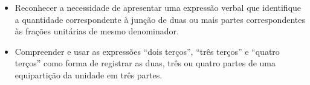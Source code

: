   \begin{objetivos}[label=chap2-ativ2]{}{}
  \begin{itemize} %
    \item Reconhecer a necessidade de apresentar uma expressão verbal que identifique a quantidade correspondente à junção de duas ou mais partes correspondentes às frações unitárias de mesmo denominador.
\item Compreender e usar as expressões ``dois terços'', ``três terços'' e ``quatro terços'' como forma de registrar as duas, três ou quatro partes de uma equipartição da unidade em três partes.
  \end{itemize} %
\end{objetivos}
\newpage

